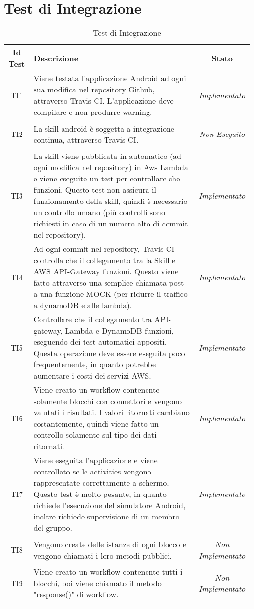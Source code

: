 \section{Test di Integrazione}
\normalsize
\begin{longtable}{|c|>{}m{8cm}|c|}
\hline 
\textbf{Id Test} & \textbf{Descrizione} & \textbf{Stato}\\
\hline
\endhead
\hypertarget{TI1}{TI1} & Viene testata l'applicazione Android ad ogni sua modifica nel repository Github, attraverso Travis-CI. L'applicazione deve compilare e non produrre warning. & \textit{Implementato}\\ \hline
\hypertarget{TI2}{TI2} & La skill android è soggetta a integrazione continua, attraverso Travis-CI. & \textit{Non Eseguito}\\ \hline
\hypertarget{TI3}{TI3} & La skill viene pubblicata in automatico (ad ogni modifica nel repository) in Aws Lambda e viene eseguito un test per controllare che funzioni. Questo test non assicura il funzionamento della skill, quindi è necessario un controllo umano (più controlli sono richiesti in caso di un numero alto di commit nel repository). & \textit{Implementato}\\ \hline
\hypertarget{TI4}{TI4} & Ad ogni commit nel repository, Travis-CI controlla che il collegamento tra la Skill e AWS API-Gateway funzioni. Questo viene fatto attraverso una semplice chiamata post a una funzione MOCK (per ridurre il traffico a dynamoDB e alle lambda). & \textit{Implementato}\\ \hline
\hypertarget{TI5}{TI5} & Controllare che il collegamento tra API-gateway, Lambda e DynamoDB funzioni, eseguendo dei test automatici appositi. Questa operazione deve essere eseguita poco frequentemente, in quanto potrebbe aumentare i costi dei servizi AWS. & \textit{Implementato}\\ \hline
\hypertarget{TI6}{TI6} & Viene creato un workflow contenente solamente blocchi con connettori e vengono valutati i risultati. I valori ritornati cambiano costantemente, quindi viene fatto un controllo solamente sul tipo dei dati ritornati. & \textit{Implementato}\\ \hline
\hypertarget{TI7}{TI7} & Viene eseguita l'applicazione e viene controllato se le activities vengono rappresentate correttamente a schermo. Questo test è molto pesante, in quanto richiede l'esecuzione del simulatore Android, inoltre richiede supervisione di un membro del gruppo. & \textit{Implementato}\\ \hline
\hypertarget{TI8}{TI8} & Vengono create delle istanze di ogni blocco e vengono chiamati i loro metodi pubblici. & \textit{Non Implementato}\\ \hline
\hypertarget{TI9}{TI9} & Viene creato un workflow contenente tutti i blocchi, poi viene chiamato il metodo "response()" di workflow. & \textit{Non Implementato}\\ \hline
\caption[Test di Integrazione]{Test di Integrazione}
\label{tabella:test2}
\end{longtable}
\clearpage

